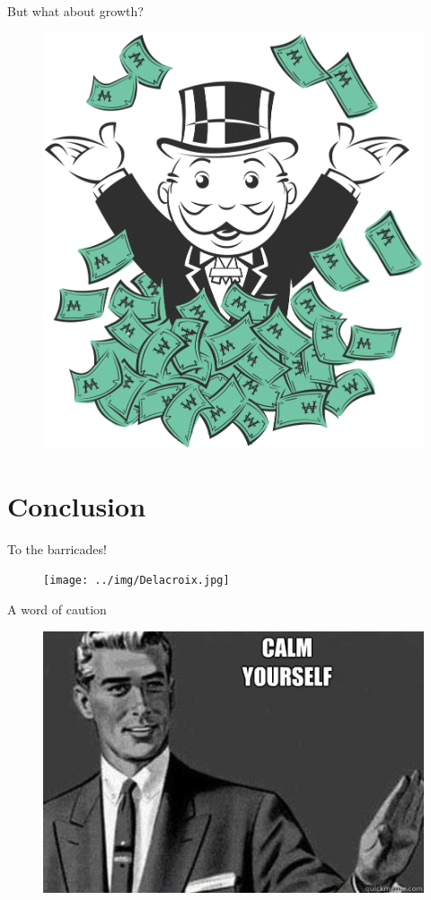 \documentclass{beamer}
\begin{document}
\begin{frame}{But what about growth?}

\begin{figure}[htpb]
	\centering
	\includegraphics[width=0.6\linewidth]{../img/monopoly.png}
\end{figure}	

\end{frame}
\section{Conclusion}

\begin{frame}{To the barricades!}

    \begin{figure}
        \centering
        \texttt{[image: ../img/Delacroix.jpg]}
        \label{fig:liberty}
    \end{figure}{}

\end{frame}

\begin{frame}{A word of caution}

	\begin{figure}[htpb]
		\centering
		\includegraphics[width=0.8\linewidth]{../img/calm.jpg}
	\end{figure}

\end{frame}
\end{document}
